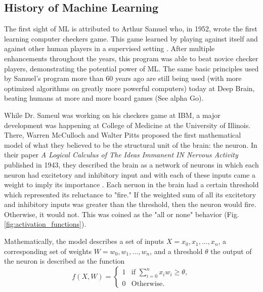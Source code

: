 \subsection{History of Machine Learning}
The first sight of ML is attributed to Arthur Samuel who, in 1952, wrote the first learning computer checkers game. This game learned by playing against itself and against other human players in a supervised setting \cite{britanica1i2016}. After multiple enhancements throughout the years, this program was able to beat novice checker players, demonstrating the potential power of ML. The same basic principles used by Samuel's program more than 60 years ago are still being used (with more optimized algorithms on greatly more powerful computers) today at Deep Brain, beating humans at more and more board games (See alpha Go).

While Dr. Sameul was working on his checkers game at IBM, a major development was happening at College of Medicine at the University of Illinois. There, Warren McCulloch and Walter Pitts proposed the first mathematical model of what they believed to be the structural unit of the brain: the neuron. In their paper \textit{A Logical Calculus of The Ideas Immanent IN Nervous Activity} published in 1943, they described the brain as a network of neurons in which each neuron had excitetory and inhibitory input and with each of these inputs came a weight to imply its importance \cite{mcculloch1943logical}. Each neruon in the brain had a certain threshold which represented its reluctance to "fire." If the weighted sum of all its excitetory and inhibitory inputs was greater than the threshold, then the neuron would fire. Otherwise, it would not. This was coined as the "all or none" behavior (Fig. \ref{fig:activation_functions}).

Mathematically, the model describes a set of inputs $X = x_0, x_1, \dots, x_n$, a corresponding set of weights $W = w_0, w_1, \dots, w_n$, and a threshold $\theta$ the output of the neuron is described as the function
\[
f(X,W)=
\begin{cases}
1 &\text{if } \sum_{i=0}^n x_iw_i \geq \theta,\\
0 &\text{Otherwise.}
\end{cases}
\]

